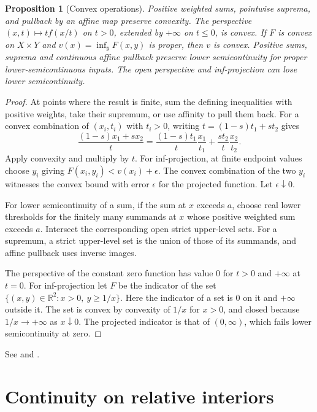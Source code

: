 \documentclass[11pt,oneside,openany]{book}
\theoremstyle{plain}
\newtheorem{proposition}[theorem]{Proposition}
\theoremstyle{definition}
\theoremstyle{remark}
\begin{document}
\begin{proposition}[Convex operations]\label{prop:convex-operations}
Positive weighted sums, pointwise suprema, and pullback by an
affine map preserve convexity. The perspective
\((x,t)\mapsto t f(x/t)\) on \(t>0\), extended by \(+\infty\)
on \(t\le0\), is convex. If \(F\) is convex on \(X\times Y\)
and \(v(x)=\inf_y F(x,y)\) is proper, then \(v\) is convex.
Positive sums, suprema and continuous affine pullback preserve
lower semicontinuity for proper lower-semicontinuous inputs.
The open perspective and inf-projection can lose lower semicontinuity.
\end{proposition}

\begin{proof}
At points where the result is finite, sum the defining
inequalities with positive weights, take their supremum, or
use affinity to pull them back. For a convex combination of
\((x_i,t_i)\) with \(t_i>0\), writing
\(t=(1-s)t_1+st_2\) gives
\[
 \frac{(1-s)x_1+sx_2}{t}
  =\frac{(1-s)t_1}{t}\frac{x_1}{t_1}
    +\frac{st_2}{t}\frac{x_2}{t_2}.
\]
Apply convexity and multiply by \(t\).
For inf-projection, at finite endpoint values choose \(y_i\)
giving \(F(x_i,y_i)<v(x_i)+\epsilon\). The convex combination
of the two \(y_i\) witnesses the convex bound with error
\(\epsilon\) for the projected function. Let \(\epsilon\downarrow0\).

For lower semicontinuity of a sum, if the sum at \(x\) exceeds
\(a\), choose real lower thresholds for the finitely many
summands at \(x\) whose positive weighted sum exceeds \(a\).
Intersect the corresponding open strict upper-level sets.
For a supremum, a strict upper-level set is the union of
those of its summands, and affine pullback uses inverse images.

The perspective of the constant zero function has value \(0\)
for \(t>0\) and \(+\infty\) at \(t=0\). For inf-projection let
\(F\) be the indicator of the set
\(\{(x,y)\in\mathbb R^2:x>0,\ y\ge1/x\}\).
Here the indicator of a set is \(0\) on it and \(+\infty\)
outside it. The set is convex by convexity of \(1/x\) for
\(x>0\), and closed because \(1/x\to+\infty\) as \(x\downarrow0\).
The projected indicator is that of \((0,\infty)\), which
fails lower semicontinuity at zero.
\end{proof}

See \cite[\S\S4--5 and 7]{Rockafellar} and
\cite[Chapter 3]{Boyd}.

\section{Continuity on relative interiors}\label{v02-02}
\end{document}
